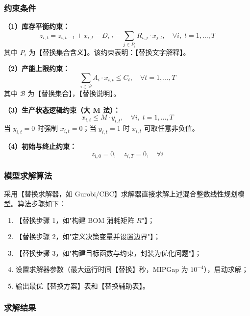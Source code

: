 \documentclass[12pt,a4paper,fontset=fandol]{ctexart}
\begin{document}
\subsubsection{约束条件}

\textbf{（1）库存平衡约束：}
\begin{equation}
    z_{i,t} = z_{i,t-1} + x_{i,t} - D_{i,t} - \sum_{j \in P_i} R_{i,j} \cdot x_{j,t}, \quad \forall i,\; t=1,\ldots,T
    \label{eq:inv1}
\end{equation}
其中 $P_i$ 为【替换集合含义】。该约束表明：【替换文字解释】。

\textbf{（2）产能上限约束：}
\begin{equation}
    \sum_{i \in \mathcal{B}} A_i \cdot x_{i,t} \leq C_t, \quad \forall t=1,\ldots,T
    \label{eq:cap1}
\end{equation}
其中 $\mathcal{B}$ 为【替换集合】，【替换说明】。

\textbf{（3）生产状态逻辑约束（大 M 法）：}
\begin{equation}
    x_{i,t} \leq M \cdot y_{i,t}, \quad \forall i,\; t=1,\ldots,T
    \label{eq:logic1}
\end{equation}
当 $y_{i,t}=0$ 时强制 $x_{i,t}=0$；当 $y_{i,t}=1$ 时 $x_{i,t}$ 可取任意非负值。

\textbf{（4）初始与终止约束：}
\begin{equation}
    z_{i,0} = 0, \quad z_{i,T} = 0, \quad \forall i
    \label{eq:bound1}
\end{equation}

\subsubsection{模型求解算法}

采用【替换求解器，如 Gurobi/CBC】求解器直接求解上述混合整数线性规划模型。算法步骤如下：
\begin{enumerate}
    \item 【替换步骤 1，如"构建 BOM 消耗矩阵 $R$"】；
    \item 【替换步骤 2，如"定义决策变量并设置边界"】；
    \item 【替换步骤 3，如"构建目标函数与约束，封装为优化问题"】；
    \item 设置求解器参数（最大运行时间【替换】秒，MIPGap 为 $10^{-4}$），启动求解；
    \item 输出最优【替换方案】表和【替换辅助表】。
\end{enumerate}

\subsubsection{求解结果}
\end{document}
